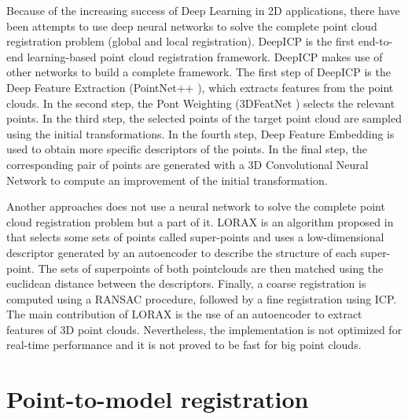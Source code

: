         Because of the increasing success of Deep Learning in 2D applications, there have been attempts to use deep neural networks
        to solve the complete point cloud registration problem (global and local registration).
        DeepICP \cite{Lu_2019_deepicp} is the first end-to-end learning-based point cloud registration framework.
        DeepICP makes use of other networks to build a complete framework.
        The first step of DeepICP is the Deep Feature Extraction (PointNet++ \cite{Qi_2017_pointnet}), which extracts features from the point clouds.
        In the second step, the Pont Weighting (3DFeatNet \cite{Yew_2018_3dfeat}) selects the relevant points.
        In the third step, the selected points of the target point cloud are sampled using the initial transformations.
        In the fourth step, Deep Feature Embedding is used to obtain more specific descriptors of the points.
        In the final step, the corresponding pair of points are generated with a 3D Convolutional Neural Network
        to compute an improvement of the initial transformation.
        
        Another approaches does not use a neural network to solve the complete point cloud registration problem but a part of it.
        LORAX is an algorithm proposed in \cite{Elbaz_2017_3dpoint} that selects some sets of points called super-points and uses a low-dimensional descriptor 
        generated by an autoencoder to describe the structure of each super-point.
        The sets of superpoints of both pointclouds are then matched using the euclidean distance between the descriptors.
        Finally, a coarse registration is computed using a RANSAC procedure, followed by a fine registration using ICP.
        The main contribution of LORAX is the use of an autoencoder to extract features of 3D point clouds. 
        Nevertheless, the implementation is not optimized for real-time performance and it is not proved to be fast for big point clouds.

    \section{Point-to-model registration}


